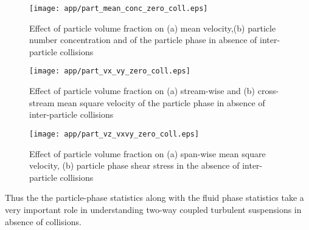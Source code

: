 \begin{figure}[!h]
			\texttt{[image: app/part\_mean\_conc\_zero\_coll.eps]}
			\caption{Effect of particle volume fraction on (a) mean velocity,(b) particle number concentration and of the particle phase in absence of inter-particle collisions} 
			\label{fig:particle_phase_stat_1_zero_coll}
		\end{figure}
		
		\begin{figure}[!h]
			\texttt{[image: app/part\_vx\_vy\_zero\_coll.eps]}
			\caption{Effect of particle volume fraction on (a) stream-wise and (b) cross-stream mean square velocity of the particle phase in absence of inter-particle collisions}
			\label{fig:particle_phase_stat_2_zero_coll}
		\end{figure} 
		\begin{figure}[!h]
			\texttt{[image: app/part\_vz\_vxvy\_zero\_coll.eps]}
			\caption{Effect of particle volume fraction on (a) span-wise mean square velocity, (b) particle phase shear stress in the  absence of inter-particle collisions} 
			\label{fig:particle_phase_stat_3_zero_coll}
		\end{figure}
   Thus the the particle-phase statistics along with the fluid phase statistics take a very important role in understanding two-way coupled turbulent suspensions in absence of collisions. 

